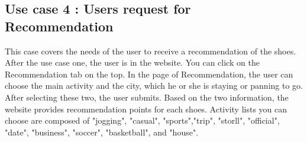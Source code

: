 \documentclass[conference]{IEEEtran}
\begin{document}
\subsection{Use case 4 : Users request for Recommendation} This case covers the needs of the user to receive a recommendation of the shoes. After the use case one, the user is in the website. You can click on the Recommendation tab on the top. In the page of Recommendation, the user can choose the main activity and the city, which he or she is staying or panning to go. After selecting these two, the user submits. Based on the two information, the website provides recommendation points for each shoes. Activity lists you can choose are composed of "jogging", "casual", "sports","trip", "storll", "official", "date", "business", "soccer", "basketball", and "house".
\begin{figure}[H]
\begin{center}

\end{center}
\end{figure}
\end{document}
